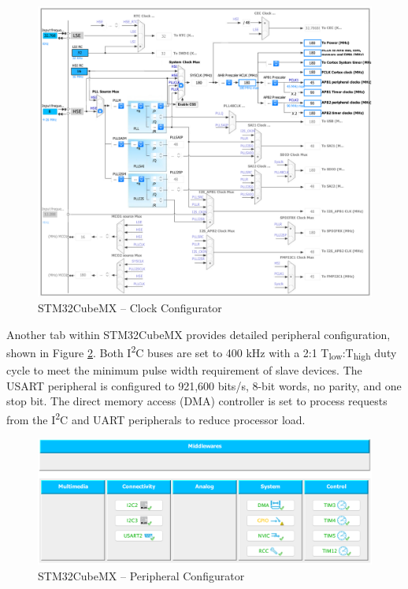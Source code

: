 \begin{figure}[H]   %
	\centering \includegraphics[width=6in, keepaspectratio]{figures/stm32cubemx_clocks.png}
	\caption{STM32CubeMX -- Clock Configurator}\label{fig:stm32cubemx_clocks}
\end{figure}
Another tab within STM32CubeMX provides detailed peripheral configuration, shown in Figure \ref{fig:stm32cubemx_config}. Both I\textsuperscript{2}C buses are set to 400 kHz with a 2:1 T\textsubscript{low}:T\textsubscript{high} duty cycle to meet the minimum pulse width requirement of slave devices. The USART peripheral is configured to 921,600 bits/s, 8-bit words, no parity, and one stop bit. The direct memory access (DMA) controller is set to process requests from the I\textsuperscript{2}C and UART peripherals to reduce processor load. 
\begin{figure}[H]   %
	\centering \includegraphics[width=6in, keepaspectratio]{figures/stm32cubemx_config.png}
	\caption{STM32CubeMX -- Peripheral Configurator}\label{fig:stm32cubemx_config}
\end{figure}
